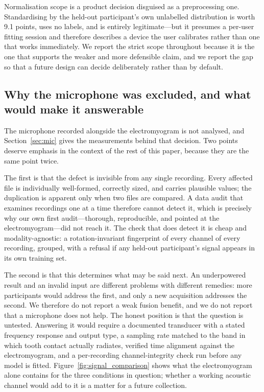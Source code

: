 \documentclass[pdflatex,sn-nature,iicol]{sn-jnl}
\begin{document}
Normalisation scope is a product decision disguised as a preprocessing one. Standardising by the held-out participant's own unlabelled distribution is worth 9.1 points, uses no labels, and is entirely legitimate---but it presumes a per-user fitting session and therefore describes a device the user calibrates rather than one that works immediately. We report the strict scope throughout because it is the one that supports the weaker and more defensible claim, and we report the gap so that a future design can decide deliberately rather than by default.

\subsection{Why the microphone was excluded, and what would make it answerable}
\label{sec:mic_discussion}

The microphone recorded alongside the electromyogram is not analysed, and Section~\ref{sec:mic} gives the measurements behind that decision. Two points deserve emphasis in the context of the rest of this paper, because they are the same point twice.

The first is that the defect is invisible from any single recording. Every affected file is individually well-formed, correctly sized, and carries plausible values; the duplication is apparent only when two files are compared. A data audit that examines recordings one at a time therefore cannot detect it, which is precisely why our own first audit---thorough, reproducible, and pointed at the electromyogram---did not reach it. The check that does detect it is cheap and modality-agnostic: a rotation-invariant fingerprint of every channel of every recording, grouped, with a refusal if any held-out participant's signal appears in its own training set.

The second is that this determines what may be said next. An underpowered result and an invalid input are different problems with different remedies: more participants would address the first, and only a new acquisition addresses the second. We therefore do not report a weak fusion benefit, and we do not report that a microphone does not help. The honest position is that the question is untested. Answering it would require a documented transducer with a stated frequency response and output type, a sampling rate matched to the band in which tooth contact actually radiates, verified time alignment against the electromyogram, and a per-recording channel-integrity check run before any model is fitted. Figure~\ref{fig:signal_comparison} shows what the electromyogram alone contains for the three conditions in question; whether a working acoustic channel would add to it is a matter for a future collection.
\end{document}
